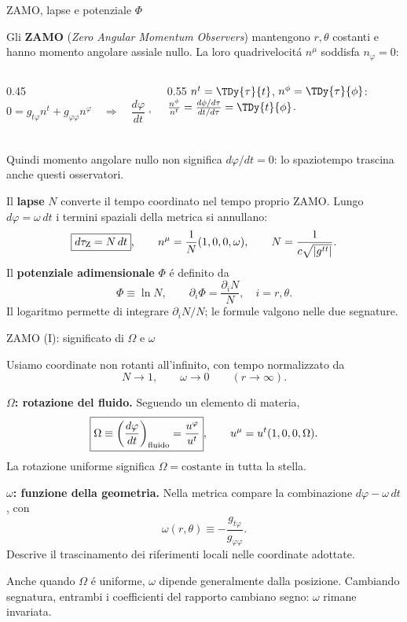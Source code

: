 \begin{frame}[t]{ZAMO, lapse e potenziale $\Phi$}
\small\raggedright
Gli \textbf{ZAMO} (\emph{Zero Angular Momentum Observers}) mantengono
$r,\theta$ costanti e hanno momento angolare assiale nullo.
La loro quadrivelocit\'a $n^\mu$ soddisfa $n_\varphi=0$:
\begin{columns}[T]
    \begin{column}{0.45\textwidth}
\[
0=g_{t\varphi}n^t+g_{\varphi\varphi}n^\varphi
\quad\Longrightarrow\quad
\boxed{\frac{d\varphi}{dt}
=-\frac{g_{t\varphi}}{g_{\varphi\varphi}}=\omega}.
\]
    \end{column}
    \begin{column}{0.55\textwidth}
        $n^t=\TDy{\tau}{t}$, $n^{\phi}=\TDy{\tau}{\phi}$: $\frac{n^{\phi}}{n^t}=\frac{d\phi/d\tau}{dt/d\tau}=\TDy{t}{\phi}$. 
    \end{column}
\end{columns}

Quindi momento angolare nullo non significa $d\varphi/dt=0$:
lo spaziotempo trascina anche questi osservatori.
\smallskip

Il \textbf{lapse} $N$ converte il tempo coordinato nel tempo proprio ZAMO.
Lungo $d\varphi=\omega\,dt$ i termini spaziali della metrica si annullano:
\[
\boxed{d\tau_{\rm Z}=N\,dt},\qquad
n^\mu=\frac1N(1,0,0,\omega),\qquad
N=\frac1{c\sqrt{|g^{tt}|}}.
\]
Il \textbf{potenziale adimensionale} $\Phi$ \'e definito da
\[
\boxed{\Phi\equiv\ln N},\qquad
\partial_i\Phi=\frac{\partial_iN}{N},\quad i=r,\theta.
\]
Il logaritmo permette di integrare $\partial_iN/N$;
le formule valgono nelle due segnature.
\end{frame}


\begin{frame}[t]{ZAMO (I): significato di $\Omega$ e $\omega$}
\small\raggedright

Usiamo coordinate non rotanti all'infinito, con tempo normalizzato da
\[
N\longrightarrow1,\qquad \omega\longrightarrow0
\qquad (r\longrightarrow\infty).
\]

\textbf{$\Omega$: rotazione del fluido.}
Seguendo un elemento di materia,
\[
\boxed{\Omega\equiv
\left(\frac{d\varphi}{dt}\right)_{\rm fluido}
=\frac{u^\varphi}{u^t}},
\qquad
u^\mu=u^t(1,0,0,\Omega).
\]
La rotazione uniforme significa $\Omega=\text{costante}$
in tutta la stella.

\medskip
\textbf{$\omega$: funzione della geometria.}
Nella metrica compare la combinazione $d\varphi-\omega\,dt$, con
\[
\boxed{\omega(r,\theta)\equiv
-\frac{g_{t\varphi}}{g_{\varphi\varphi}}}.
\]
Descrive il trascinamento dei riferimenti locali
nelle coordinate adottate.

\medskip
Anche quando $\Omega$ \'e uniforme,
$\omega$ dipende generalmente dalla posizione.
Cambiando segnatura, entrambi i coefficienti del rapporto
cambiano segno: $\omega$ rimane invariata.

\end{frame}


